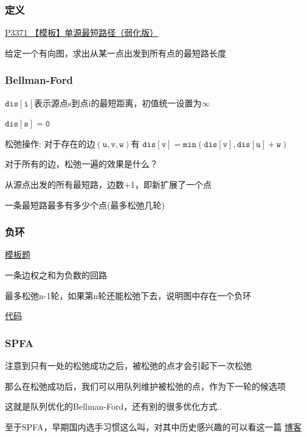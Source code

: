 \documentclass{beamer}
\begin{document}
  \begin{frame}
    \frametitle{定义}
    \href{https://www.luogu.com.cn/problem/P3371}{P3371 【模板】单源最短路径（弱化版）}
    
    给定一个有向图，求出从某一点出发到所有点的最短路长度
  \end{frame}

  \begin{frame}
    \frametitle{Bellman-Ford}
    $\mathtt{dis[i]}$表示源点s到点i的最短距离，初值统一设置为$\infty$

    \vspace*{1\baselineskip}

    $\mathtt{dis[s]=0}$

    \vspace*{1\baselineskip}
    
    松弛操作: 对于存在的边$\mathtt{(u,v,w)}$有
    $\mathtt{dis[v]=min(dis[v],dis[u]+w)}$
    
    对于所有的边，松弛一遍的效果是什么？
    
    \pause
    \vspace*{1\baselineskip}
    
    从源点出发的所有最短路，边数+1，即新扩展了一个点
    
    \pause
    \vspace*{1\baselineskip}
    
    一条最短路最多有多少个点(最多松弛几轮)
  \end{frame}
  
  \begin{frame}
    \frametitle{负环}

    \href{https://www.luogu.com.cn/problem/P3385}{模板题}

    \vspace*{1\baselineskip}
    
    一条边权之和为负数的回路

    \vspace*{1\baselineskip}
    
    最多松弛n-1轮，如果第n轮还能松弛下去，说明图中存在一个负环
    
    \vspace*{1\baselineskip}
    
    \href{http://syh521.cn/file/Negative_ring.cpp}{代码}
  \end{frame}

  \begin{frame}
    \frametitle{SPFA}
    
    注意到只有一处的松弛成功之后，被松弛的点才会引起下一次松弛

    \vspace*{1\baselineskip}
    
    那么在松弛成功后，我们可以用队列维护被松弛的点，作为下一轮的候选项
    
    这就是队列优化的Bellman-Ford，还有别的很多优化方式..
    
    \vspace*{1\baselineskip}

    至于SPFA，早期国内选手习惯这么叫，对其中历史感兴趣的可以看这一篇
    \href{https://blog.csdn.net/sidnee/article/details/106231883}{博客}
  
  \end{frame}
\end{document}
